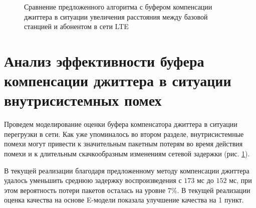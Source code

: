 \pgfplotsset{width=15cm, height=10cm, compat=1.3}
\begin{figure} [!ht]
  \center
{}
\caption{Сравнение предложенного алгоритма с буфером компенсации джиттера \cite{Ramjee} в ситуации увеличения расстояния между базовой станцией и абонентом в сети LTE}
  \label{img4:distBuff}
\end{figure}















\section{Анализ эффективности буфера компенсации джиттера в ситуации внутрисистемных помех} \label{sect4}

Проведем моделирование оценки буфера компенсатора джиттера в ситуации перегрузки в сети. 
Как уже упоминалось во втором разделе, внутрисистемные помехи могут привести к значительным пакетным потерям во время действия помехи и к длительным скачкообразным изменениям сетевой задержки (рис. \ref{img4:distBuff}).


В текущей реализации благодаря предложенному методу компенсации джиттера удалось уменьшить среднюю задержку воспроизведения с $173$ мс до $152$ мс, при этом вероятность потери пакетов осталась на уровне $7\%$.
В текущей реализации оценка качества на основе E-модели показала улучшение качества на 1 пункт.



